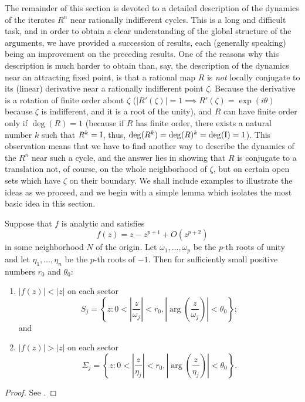 The remainder of this section is devoted to a detailed description of the
dynamics of the iterates $R^n$ near rationally indifferent cycles. This is a
long and difficult task, and in order to obtain a clear understanding of the
global structure of the arguments, we have provided a succession of results,
each (generally speaking) being an improvement on the preceding results. One of
the reasons why this description is much harder to obtain than, say, the
description of the dynamics near an attracting fixed point, is that a rational
map $R$ is \emph{not} locally conjugate to its (linear) derivative near a
rationally indifferent point $\zeta$. Because the derivative is a rotation of
finite order about $\zeta$ ($|R'(\zeta)| = 1 \implies R'(\zeta) = \exp(i
\theta)$ because $\zeta$ is indifferent, and it is a root of the unity), and $R$
can have finite order only if $\deg(R) = 1$ (because if $R$ has finite order,
there exists a natural number $k$ such that $R^k = \mathrm{I}$, thus, $\deg(R^k) =
\deg(R)^k = \deg(\mathrm{I}) = 1$). This observation means that we have to find another
way to describe the dynamics of the $R^n$ near such a cycle, and the answer lies
in showing that $R$ is conjugate to a translation not, of course, on the whole
neighborhood of $\zeta$, but on certain open sets which have $\zeta$ on their
boundary. We shall include examples to illustrate the ideas as we proceed, and
we begin with a simple lemma which isolates the most basic idea in this section.

\begin{lemma}
    \label{lem:alternating_attracting_and_repelling_sectors_for_a_rationally_indifferent_point}
    Suppose that $f$ is analytic and satisfies
    \begin{equation*}
        f(z) = z - z^{p+1} + O(z^{p+2})
    \end{equation*}
    in some neighborhood $N$ of the origin. Let $\omega_1, \dots, \omega_p$ be
    the $p$-th roots of unity and let $\eta_1, \dots, \eta_n$ be the $p$-th
    roots of $-1$. Then for sufficiently small positive numbers $r_0$ and
    $\theta_0$:
    \begin{enumerate}[label=(\roman*)]
        \item $|f(z)| < |z|$ on each sector
        \begin{equation*}
            S_j = \left\{z \colon 0 < \left|\frac{z}{\omega_j}\right| < r_0, \left|\arg\left(\frac{z}{\omega_j}\right)\right| < \theta_0\right\};
        \end{equation*}
        and
        \item $|f(z)| > |z|$ on each sector
        \begin{equation*}
            \Sigma_j = \left\{z \colon 0 < \left|\frac{z}{\eta_j}\right| < r_0, \left|\arg\left(\frac{z}{\eta_j}\right)\right| < \theta_0\right\}.
        \end{equation*}
    \end{enumerate}
\end{lemma}
\begin{proof}
    See \cite[112]{Beardon1991}.
\end{proof}

